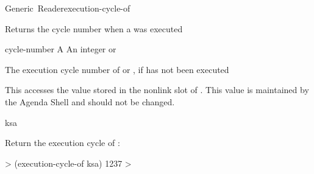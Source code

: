 \documentclass[10pt,twoside,english,pdftex]{article}
\begin{document}
\begin{functiondoc}{Generic~Reader}{execution-cycle-of}{ 
    }
%
%

\fnsyntax

\fnpurpose Returns the cycle number when a  was executed

\fnmethods
{}

\fnpackage {}

\fnmodule {}

\fnargs
\begin{args}{cycle-number}
\arg[ksa] A 
 An integer or \nil{}
\end{args}

\fnreturns The execution cycle number of  or \nil, if  has
not been executed
  
\fndescription 
This  accesses the value stored in the 
 nonlink slot of . This value is
maintained by the Agenda Shell and should not be changed.

\begin{alsos}{ksa}
\also[ksa]
\end{alsos}

\fnexample
Return the execution cycle of :
%
\W\supp
\begin{example}
  > (execution-cycle-of ksa)
  1237
  >
\end{example}

\end{functiondoc}

 
\end{document}
